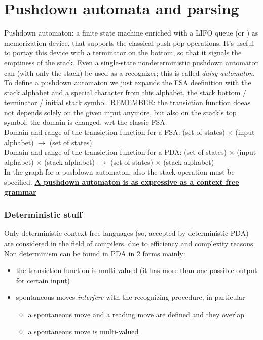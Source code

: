 \documentclass[10pt,a4paper]{article}
\begin{document}
	\part{Pushdown automata and parsing}
		Pushdown automaton: a finite state machine enriched with a LIFO queue (or ) as memorization device, that supports the classical push-pop operations. It's useful to portay this device with a terminator on the bottom, so that it signals the emptiness of the stack. Even a single-state nondeterministic pushdown automaton can (with only the stack) be used as a recognizer; this is called \emph{daisy automaton}.\\
		To define a pushdown automaton we just expands the FSA deefinition with the stack alphabet and a special character from this alphabet, the stack bottom / terminator / initial stack symbol. REMEMBER: the transiction function doeas not depends solely on the given input anymore, but also on the stack's top symbol; the domain is changed, wrt the classic FSA.\\
		Domain and range of the transiction function for a FSA: (set of states) $\times$ (input alphabet) $\rightarrow$ (set of states)\\
		Domain and range of the transiction function for a PDA: (set of states) $\times$ (input alphabet) $\times$ (stack alphabet) $\rightarrow$ (set of states) $\times$ (stack alphabet)\\
		In the graph for a pushdown automaton, also the stack operation must be specified.
		\textbf{\underline{A pushdown automaton is as expressive as a context free grammar}}
		
		\section{Deterministic stuff}
			Only deterministic context free languages (so, accepted by deterministic PDA) are considered in the field of compilers, due to efficiency and complexity reasons.\\
			Non determinism can be found in PDA in 2 forms mainly:
			\begin{itemize}
				\item the transiction function is multi valued (it has more than one possible output for certain input)
				\item spontaneous moves \emph{interfere} with the recognizing procedure, in particular
					\begin{itemize}
						\item a spontaneous move and a reading move are defined and they overlap
						\item a spontaneous move is multi-valued
					\end{itemize}
			\end{itemize}
			
\end{document}
